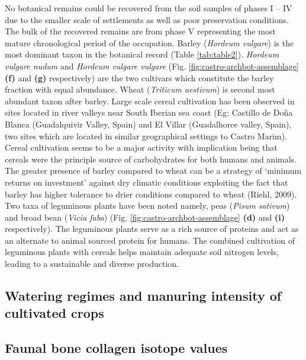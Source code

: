 \documentclass[5p]{elsarticle} %
\begin{document}
No botanical remains could be recovered from the soil samples of phases I -- IV due to the smaller scale of settlements as well as poor preservation conditions. The bulk of the recovered remains are from phase V representing the most mature chronological period of the occupation. Barley (\emph{Hordeum vulgare}) is the most dominant taxon in the botanical record (Table \ref{tab:table2}). \emph{Hordeum vulgare nudum} and \emph{Hordeum vulgare vulgare} (Fig. \ref{fig:castro-archbot-assemblage} \textbf{(f)} and \textbf{(g)} respectively) are the two cultivars which constitute the barley fraction with equal abundance. Wheat (\emph{Triticum aestivum}) is second most abundant taxon after barley. Large scale cereal cultivation has been observed in sites located in river valleys near South Iberian sea coast (Eg: Castillo de Doña Blanca (Guadalquivir Valley, Spain) and El Villar (Guadalhorce valley, Spain), two sites which are located in similar geographical settings to Castro Marim). Cereal cultivation seems to be a major activity with implication being that cereals were the principle source of carbohydrates for both humans and animals. The greater presence of barley compared to wheat can be a strategy of `minimum returns on investment' against dry climatic conditions exploiting the fact that barley has higher tolerance to drier conditions compared to wheat (Riehl, 2009). Two taxa of leguminous plants have been noted namely, peas (\emph{Pisum sativum}) and broad bean (\emph{Vicia faba}) (Fig. \ref{fig:castro-archbot-assemblage} \textbf{(d)} and \textbf{(i)} respectively). The leguminous plants serve as a rich source of proteins and act as an alternate to animal sourced protein for humans. The combined cultivation of leguminous plants with cereals helps maintain adequate soil nitrogen levels, leading to a sustainable and diverse production.

\hypertarget{watering-regimes-and-manuring-intensity-of-cultivated-crops}{%
\subsection{Watering regimes and manuring intensity of cultivated crops}\label{watering-regimes-and-manuring-intensity-of-cultivated-crops}}

\hypertarget{faunal-bone-collagen-isotope-values}{%
\subsection{Faunal bone collagen isotope values}\label{faunal-bone-collagen-isotope-values}}
\end{document}
